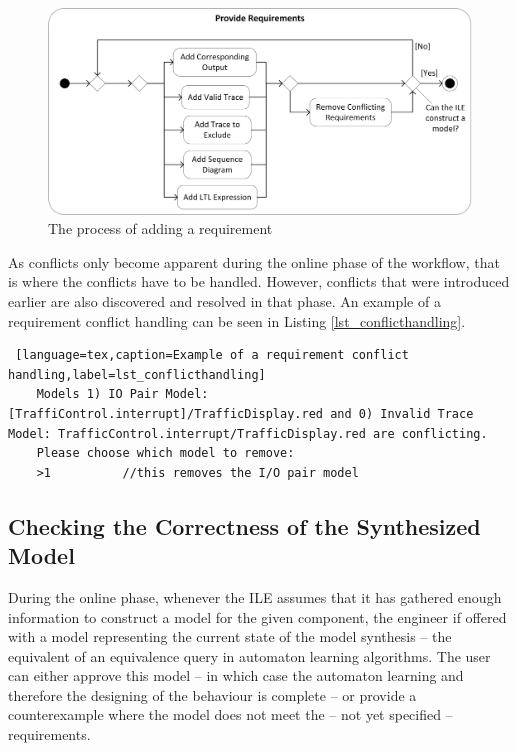 \begin{figure}[!ht] 
	\centering
		\includegraphics[width=130mm, keepaspectratio]{figures/methodology_providerequirementsworkflow.png}
	\caption{The process of adding a requirement}
	\label{fig_providerequirementsworkflow}
\end{figure}


As conflicts only become apparent during the online phase of the workflow, that is where the conflicts have to be handled. However, conflicts that were introduced earlier are also discovered and resolved in that phase. An example of a requirement conflict handling can be seen in Listing \ref{lst_conflicthandling}.

\bigskip
\begin{minipage}{\linewidth}
\begin{lstlisting} [language=tex,caption=Example of a requirement conflict handling,label=lst_conflicthandling]
	Models 1) IO Pair Model: [TraffiControl.interrupt]/TrafficDisplay.red and 0) Invalid Trace Model: TrafficControl.interrupt/TrafficDisplay.red are conflicting.
	Please choose which model to remove: 
	>1			//this removes the I/O pair model
\end{lstlisting}%
\end{minipage}

\subsection{Checking the Correctness of the Synthesized Model} \label{subs_eq}
During the online phase, whenever the ILE assumes that it has gathered enough information to construct a model for the given component, the engineer if offered with a model representing the current state of the model synthesis -- the equivalent of an equivalence query in automaton learning algorithms. The user can either approve this model -- in which case the automaton learning and therefore the designing of the behaviour is complete -- or provide a counterexample where the model does not meet the -- not yet specified -- requirements.

